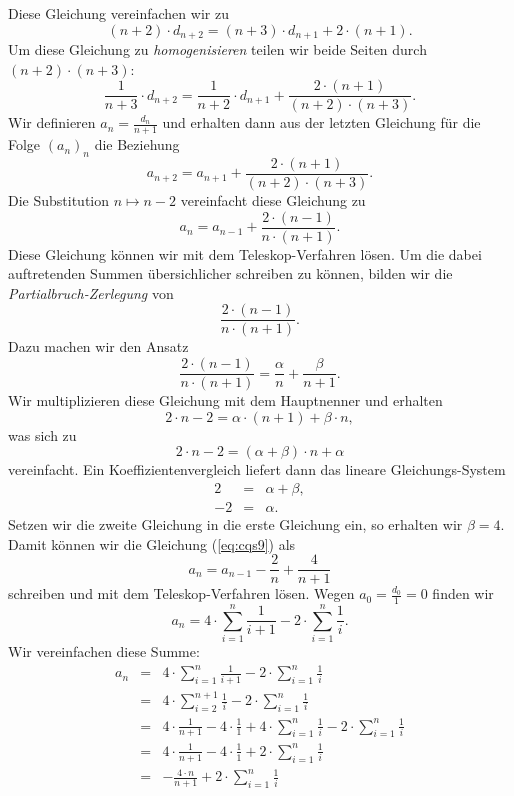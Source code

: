 Diese Gleichung vereinfachen wir zu
\begin{equation}
  \label{eq:cqs7}
(n+2)\cdot d_{n+2} = (n+3)\cdot \displaystyle d_{n+1} + 2\cdot(n+1).  
\end{equation}
Um diese Gleichung zu \emph{homogenisieren} teilen wir beide Seiten durch $(n+2) \cdot(n+3)$:
\begin{equation}
  \label{eq:cqs8}
 \frac{1}{n+3} \cdot d_{n+2} = \frac{1}{n+2}\cdot d_{n+1} + \frac{2\cdot(n+1)}{(n+2)\cdot(n+3)}.
\end{equation}
Wir definieren $\displaystyle a_n = \frac{d_n}{n+1}$ und erhalten dann aus der
letzten Gleichung für die Folge $(a_n)_n$ die Beziehung
\[ a_{n+2} = a_{n+1} + \frac{2\cdot(n+1)}{(n+2)\cdot(n+3)}. \]
Die Substitution $n \mapsto n-2$ vereinfacht diese Gleichung zu 
\begin{equation}
  \label{eq:cqs9}
 a_{n} = a_{n-1} + \frac{2\cdot(n-1)}{n\cdot(n+1)}.
\end{equation}
Diese Gleichung können wir mit dem Teleskop-Verfahren lösen.  Um die dabei auftretenden Summen übersichlicher
schreiben zu können,  bilden wir die \emph{Partialbruch-Zerlegung} von 
\[ \frac{2\cdot(n-1)}{n\cdot(n+1)}. \] 
Dazu machen wir den Ansatz
\[ \frac{2\cdot(n-1)}{n\cdot(n+1)} = \frac{\alpha}{n} + \frac{\beta}{n+1}.\]
Wir multiplizieren diese Gleichung mit dem Hauptnenner und erhalten
\[ 2\cdot n - 2 = \alpha \cdot (n+1) + \beta \cdot n, \]
was sich zu 
\[ 2\cdot n - 2 = (\alpha + \beta) \cdot n + \alpha \]
vereinfacht.  Ein Koeffizientenvergleich liefert dann das lineare Gleichungs-System
\begin{eqnarray*}
  2 & = & \alpha + \beta, \\
 -2 & = & \alpha.
\end{eqnarray*}
Setzen wir die zweite Gleichung in die erste Gleichung ein, so erhalten wir $\beta = 4$.
Damit können wir die Gleichung (\ref{eq:cqs9}) als 
\begin{equation}
  \label{eq:cqs10}
 a_{n} = a_{n-1} - \frac{2}{n} + \frac{4}{n+1}  
\end{equation}
schreiben und mit  dem Teleskop-Verfahren lösen.  Wegen $a_0 = \frac{d_0}{1} = 0$ finden wir
\begin{equation}
  \label{eq:cqs11}
 a_{n} = 4 \cdot \sum_{i=1}^n \frac{1}{i+1} - 2 \cdot \sum_{i=1}^n \frac{1}{i}.  
\end{equation}
Wir vereinfachen diese Summe:
\[
\begin{array}{lcl}
 a_{n} & = & \displaystyle 4 \cdot \sum_{i=1}^n \frac{1}{i+1} - 2 \cdot \sum_{i=1}^n \frac{1}{i} \\[0.5cm]
       & = & \displaystyle 4 \cdot \sum_{i=2}^{n+1} \frac{1}{i} - 2 \cdot \sum_{i=1}^n \frac{1}{i} \\[0.5cm]
       & = & \displaystyle 4 \cdot \frac{1}{n+1} - 4 \cdot \frac{1}{1} + 4 \cdot \sum_{i=1}^{n} \frac{1}{i} - 2 \cdot \sum_{i=1}^n \frac{1}{i} \\[0.5cm]
       & = & \displaystyle 4 \cdot \frac{1}{n+1} - 4 \cdot \frac{1}{1} + 2 \cdot \sum_{i=1}^{n} \frac{1}{i}  \\[0.5cm]
       & = & \displaystyle - \frac{4 \cdot n}{n+1}  + 2 \cdot \sum_{i=1}^{n} \frac{1}{i}  
\end{array}
\]
